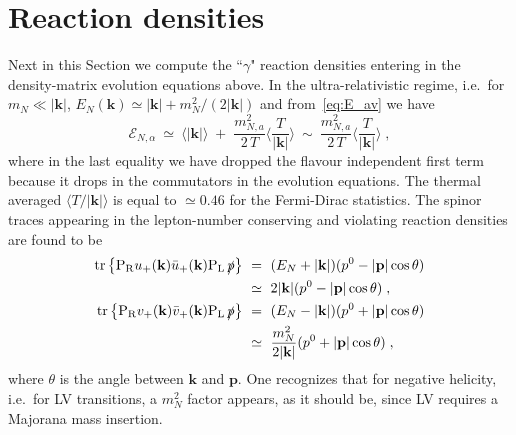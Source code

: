 \documentclass[prd,twocolumn,superscriptaddress,preprintnumbers,nofootinbib,
noshowpacs,groupedaddress]{revtex4-1} %
\DeclareMathOperator{\tr}{tr}
\newcommand{\ve}[1]{\mathbf{#1}}
\begin{document}

\section{Reaction densities}  

Next in this Section we compute the ``$\gamma$" reaction densities entering in the density-matrix evolution equations above.
In the ultra-relativistic regime, i.e.~for $m_N \ll | \ve k |$, $E_N(\ve k) \simeq |\ve k| + m^2_N/(2|\ve k|)$ and from~\eqref{eq:E_av} we have
\begin{equation}
\mathcal E_{N,\alpha} \ \simeq \ \langle | \ve k | \rangle \;+\; \frac{m^2_{N,a}}{2 \, T} \bigg\langle \frac{T}{| \ve k|} \bigg \rangle \ \sim \ \frac{m^2_{N,a}}{2 \, T} \bigg\langle \frac{T}{| \ve k|} \bigg \rangle  \;,
\end{equation}
where in the last equality we have dropped the flavour independent first term because it drops in the commutators in the evolution equations. The thermal averaged $\langle T / |\ve k| \rangle$ is equal to $\simeq 0.46$ for the Fermi-Dirac statistics.
The spinor traces appearing in the lepton-number conserving and violating reaction densities are found to be
\begin{align}
\tr \big\{\mathrm{P_R} u_+(\ve k) \bar u_+(\ve k) \mathrm{P_L}  \, \slashed{p} \big\} \ &=\ (E_N + | \ve k|)(p^0 - |\ve p| \cos \theta) \notag\\
&\simeq \  2 | \ve k| (p^0 - |\ve p| \cos \theta) \;, \\
\tr \big\{\mathrm{P_R} v_+(\ve k) \bar v_+(\ve k) \mathrm{P_L}  \, \slashed{p} \big\} \ &=\ (E_N - | \ve k|)(p^0 + |\ve p| \cos \theta) \notag\\
&\simeq \  \frac{m_N^2}{2 | \ve k|} (p^0 + |\ve p| \cos \theta) \;,
\end{align}
where $\theta$ is the angle between $\ve k$ and $\ve p$. One recognizes that for negative helicity, i.e.~for LV transitions, a $m_N^2$ factor appears, as it should be, since LV requires a Majorana mass insertion. 
\end{document}
